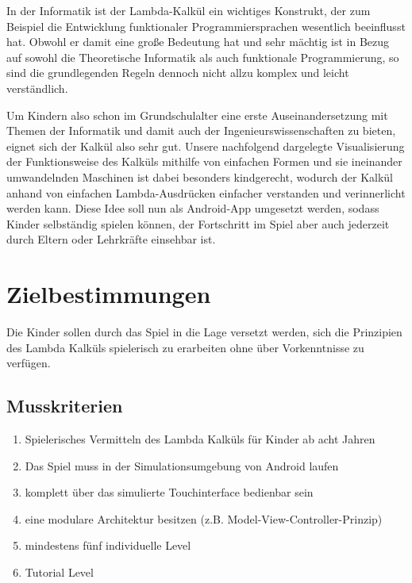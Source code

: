 \documentclass{scrartcl}
\begin{document}
In der Informatik ist der Lambda-Kalkül ein wichtiges Konstrukt, der
zum Beispiel die Entwicklung funktionaler Programmiersprachen wesentlich
beeinflusst hat. Obwohl er damit eine große Bedeutung hat und sehr
mächtig ist in Bezug auf sowohl die Theoretische Informatik als auch
funktionale Programmierung, so sind die grundlegenden Regeln dennoch
nicht allzu komplex und leicht verständlich. 

Um Kindern also schon im Grundschulalter eine erste Auseinandersetzung
mit Themen der Informatik und damit auch der Ingenieurswissenschaften
zu bieten, eignet sich der Kalkül also sehr gut. Unsere nachfolgend
dargelegte Visualisierung der Funktionsweise des Kalküls mithilfe
von einfachen Formen und sie ineinander umwandelnden Maschinen ist
dabei besonders kindgerecht, wodurch der Kalkül anhand von einfachen
Lambda-Ausdrücken einfacher verstanden und verinnerlicht werden kann.
Diese Idee soll nun als Android-App umgesetzt werden, sodass Kinder
selbständig spielen können, der Fortschritt im Spiel aber auch jederzeit
durch Eltern oder Lehrkräfte einsehbar ist. 

\clearpage









\section{Zielbestimmungen}


Die Kinder sollen durch das Spiel in die Lage versetzt werden, sich die Prinzipien des Lambda Kalküls spielerisch zu erarbeiten ohne über Vorkenntnisse zu verfügen.

\subsection{Musskriterien}

\begin{enumerate}
	\item \label{muss:vermittelnlamba}Spielerisches Vermitteln des Lambda Kalküls für Kinder ab acht Jahren
	\item \label{muss:simulationandroid}Das Spiel muss in der Simulationsumgebung von Android laufen
	\item \label{muss:touchinterface}komplett über das simulierte Touchinterface bedienbar sein
	\item \label{muss:mvc}eine modulare Architektur besitzen (z.B. Model-View-Controller-Prinzip)
	\item \label{muss:5indilevel}mindestens fünf individuelle Level
	\item \label{muss:tutorial}Tutorial Level
\end{enumerate}
\end{document}
